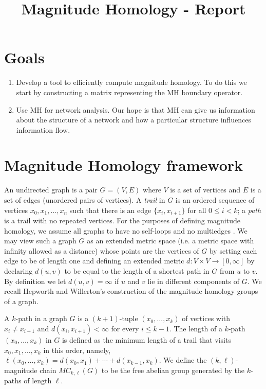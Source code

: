 \documentclass{article}
\title{Magnitude Homology - Report}
\begin{document}
	
	\maketitle
	
	\section{Goals}
	\begin{enumerate}
		\item Develop a tool to efficiently compute magnitude homology. To do this we start by constructing a matrix representing the MH boundary operator.
		
		\item Use MH for network analysis. Our hope is that MH can give us information about the structure of a network and how a particular structure influences information flow.
	\end{enumerate}
	
	\section{Magnitude Homology framework}
	An undirected graph is a pair $G=(V,E)$ where $V$ is a set of vertices and $E$ is a set of edges (unordered pairs of vertices). A \emph{trail} in $G$ is an ordered sequence of vertices $x_0,x_1,\ldots,x_n$ such that there is an edge $\{x_i,x_{i+1}\}$ for all $0\leq i<k$; a \emph{path} is a trail with no repeated vertices.
	For the purposes of defining magnitude homology, we assume all graphs to have no self-loops and no multiedges \cite{leinster2019magnitude}.
	We may view such a graph $G$ as an extended metric space (i.e. a metric space with infinity allowed as a distance) whose points are the vertices of $G$ by setting each edge to be of length one and defining an extended metric $d:V \times V \to [0,\infty]$ by declaring $d(u,v)$ to be equal to the length of a shortest path in $G$ from $u$ to $v$.
	By definition we let $d(u,v) = \infty$ if $u$ and $v$ lie in different components of $G$.
	We recall Hepworth and Willerton's construction \cite{hepworth2015categorifying} of the magnitude homology groups of a graph.
	
	A $k$-path in a graph $G$ is a $(k+1)$-tuple $(x_0,\dots,x_k)$ of vertices  with $x_i \neq x_{i+1}$ and $d(x_i,x_{i+1})<\infty$ for every $i \leq k-1$.
	The length of a $k$-path $(x_0,\dots,x_k)$ in $G$ is defined as the minimum length of a trail that visits $x_0,x_1,\ldots,x_k$ in this order, namely, 
	\(
	\ell (x_0,\dots,x_k) = d(x_0,x_1)+\cdots + d(x_{k-1},x_k).
	\)
	We define the $(k,\ell)$-magnitude chain $MC_{k,\ell}(G)$ to be the free abelian group generated by the $k$-paths of length $\ell$.
	
\end{document}
